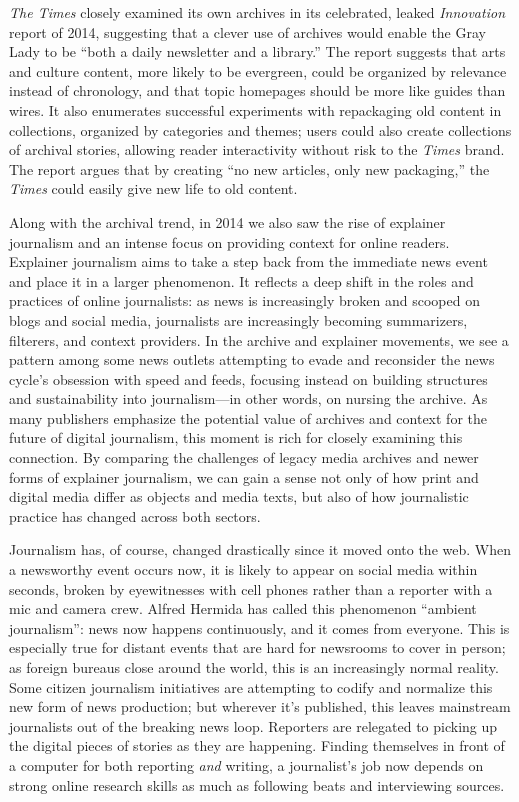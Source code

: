 \emph{The Times} closely examined its own archives in its celebrated, leaked \emph{Innovation} report of 2014, suggesting that a clever use of archives would enable the Gray Lady to be ``both a daily newsletter and a library.''\autocite[28]{_innovation_2014} The report suggests that arts and culture content, more likely to be evergreen, could be organized by relevance instead of chronology, and that topic homepages should be more like guides than wires. It also enumerates successful experiments with repackaging old content in collections, organized by categories and themes; users could also create collections of archival stories, allowing reader interactivity without risk to the \emph{Times} brand. The report argues that by creating ``no new articles, only new packaging,'' the \emph{Times} could easily give new life to old content.\autocite[34]{_innovation_2014}

Along with the archival trend, in 2014 we also saw the rise of explainer journalism and an intense focus on providing context for online readers. Explainer journalism aims to take a step back from the immediate news event and place it in a larger phenomenon. It reflects a deep shift in the roles and practices of online journalists: as news is increasingly broken and scooped on blogs and social media, journalists are increasingly becoming summarizers, filterers, and context providers. In the archive and explainer movements, we see a pattern among some news outlets attempting to evade and reconsider the news cycle's obsession with speed and feeds, focusing instead on building structures and sustainability into journalism---in other words, on nursing the archive. As many publishers emphasize the potential value of archives and context for the future of digital journalism, this moment is rich for closely examining this connection. By comparing the challenges of legacy media archives and newer forms of explainer journalism, we can gain a sense not only of how print and digital media differ as objects and media texts, but also of how journalistic practice has changed across both sectors.

Journalism has, of course, changed drastically since it moved onto the web. When a newsworthy event occurs now, it is likely to appear on social media within seconds, broken by eyewitnesses with cell phones rather than a reporter with a mic and camera crew. Alfred Hermida has called this phenomenon ``ambient journalism'': news now happens continuously, and it comes from everyone.\autocite{hermida_twittering_2010} This is especially true for distant events that are hard for newsrooms to cover in person; as foreign bureaus close around the world, this is an increasingly normal reality. Some citizen journalism initiatives are attempting to codify and normalize this new form of news production;\autocite[See][]{zuckerman_international_2010} but wherever it's published, this leaves mainstream journalists out of the breaking news loop. Reporters are relegated to picking up the digital pieces of stories as they are happening. Finding themselves in front of a computer for both reporting \emph{and} writing, a journalist's job now depends on strong online research skills as much as following beats and interviewing sources.

